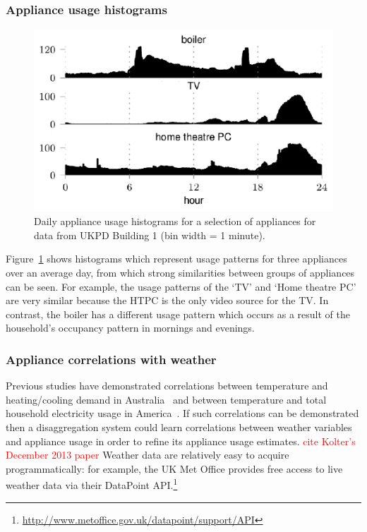 \documentclass{sig-alternate}
\newcommand{\redcolor}[1]{\textcolor{red}{#1}}
\newcommand{\bluecolor}[1]{\textcolor{blue}{#1}}
\begin{document}
\subsubsection{Appliance usage histograms}
\label{sec:usage_hist}
\begin{figure}[!t]
  \centering
  \includegraphics[width=\columnwidth]{figures/daily_usage_histograms2.pdf}
  \caption{Daily appliance usage histograms for a selection of
    appliances for data from UKPD Building 1 (bin width = 1 minute).}
  \label{fig:daily_usage_histograms}
\end{figure} 

\noindent
Figure~\ref{fig:daily_usage_histograms} shows histograms which represent usage patterns for three appliances over
an average day, from which strong similarities between groups of appliances can be seen.  For
example, the usage patterns of the `TV' and `Home theatre PC' are very
similar because the HTPC is the only video source for the TV. In contrast, the boiler has a different usage pattern which occurs as a result of the household's occupancy pattern in mornings and evenings.

\subsubsection{Appliance correlations with weather}
\label{sec:weather_correlation}
\noindent
Previous studies have demonstrated correlations
between temperature and heating/cooling demand in
Australia~\cite{RicharddeDear2002} and between temperature and total
household electricity usage in America~\cite{Kavousian2013a}.  
If such correlations can be demonstrated then a disaggregation
system could learn correlations between weather variables and
appliance usage in order to refine its appliance usage estimates. \redcolor{cite Kolter's December 2013 paper}
Weather data are relatively easy to acquire programmatically: for
example, the UK Met Office provides free access to live weather data
via their DataPoint API.\footnote{\url{http://www.metoffice.gov.uk/datapoint/support/API}}
\end{document}
